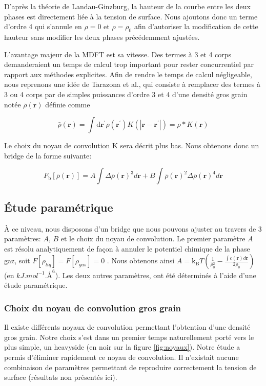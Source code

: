 D'après la théorie de Landau-Ginzburg\cite{Ginzburg2009}, la hauteur de la courbe entre les deux phases est directement liée à la tension de surface. Nous ajoutons donc un terme d'ordre 4 qui s'annule en $\rho=0$ et $\rho=\rho_0$ afin d'autoriser la modification de cette hauteur sans modifier les deux phases précédemment ajustées.

L'avantage majeur de la MDFT est sa vitesse. Des termes à 3 et 4 corps demanderaient un temps de calcul trop important pour rester concurrentiel par rapport aux méthodes explicites. Afin de rendre le temps de calcul négligeable, nous reprenons une idée de Tarazona et al.\cite{tarazona_free-energy_1985}, qui consiste à remplacer des termes à 3 ou 4 corps par de simples puissances d'ordre 3 et 4 d'une densité gros grain notée $\bar{\rho}(\boldsymbol{r})$ définie comme

\begin{equation} \label{eq:convolution_gros_grain}
\bar{\rho}(\boldsymbol{r}) = \int \mathrm{d}\boldsymbol{r}^\prime \rho(\boldsymbol{r}^\prime) K\left(\left|\boldsymbol{r}-\boldsymbol{r}^\prime\right|\right) = \rho\ast K \left(\boldsymbol{r} \right)
\end{equation}

Le choix du noyau de convolution K sera décrit plus bas. Nous obtenons donc un bridge de la forme suivante:

\begin{equation} \label{eq:fbridge_2}
F_{\mathrm{b}}[\bar{\rho}(\boldsymbol{r})]=A\int\Delta\bar{\rho}(\boldsymbol{r})^3d\boldsymbol{r}+B\int\bar{\rho}(\boldsymbol{r})^2\Delta\bar{\rho}(\boldsymbol{r})^4d\boldsymbol{r}
\end{equation} 


\subsection{\'Etude paramétrique}
À ce niveau, nous disposons d'un bridge que nous pouvons ajuster au travers de 3 paramètres: $A$, $B$ et le choix du noyau de convolution. Le premier paramètre $A$ est résolu analytiquement de façon à annuler le potentiel chimique de la phase gaz, soit $F[\rho_{liq}]=F[\rho_{gas}]=0$ . Nous obtenons ainsi $A=\mathrm{k_B}T(\frac{1}{\rho_0^2} - \frac{\int c(\boldsymbol{r}) d\boldsymbol{r}}{2\rho_0})$ (en $kJ.mol^{-1}.\text{\AA}^{6}$). Les deux autres paramètres, ont été déterminés à l'aide d'une étude paramétrique.

\subsubsection{Choix du noyau de convolution gros grain}
Il existe différents noyaux de convolution permettant l'obtention d'une densité gros grain. Notre choix s'est dans un premier temps naturellement porté vers le plus simple, un heavyside (en noir sur la figure \ref{fig:noyaux}). Notre étude a permis d'éliminer rapidement ce noyau de convolution. Il n'existait aucune combinaison de paramètres permettant de reproduire correctement la tension de surface (résultats non présentés ici). 










